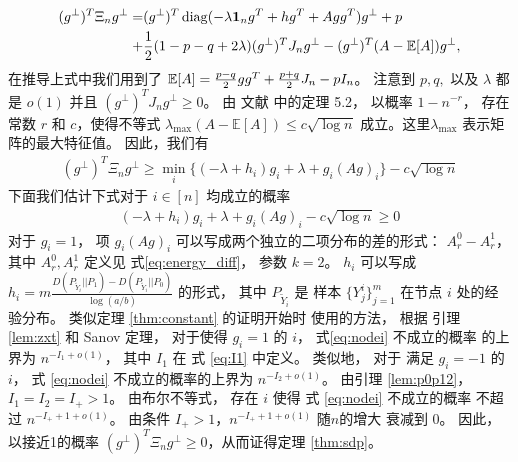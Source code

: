 \begin{align*}
    (g^{\perp})^T \Xi_n g^{\perp} 
    =& (g^{\perp})^T \operatorname{diag}( -\lambda \mathbf{1}_ng^T+hg^T + Agg^T) g^{\perp} + p \\
    +& \frac{1}{2}(1-p-q+2\lambda)(g^{\perp})^TJ_n g^{\perp}
    -(g^{\perp})^T(A-\operatorname{\mathbb{E}}[A])g^{\perp},
\end{align*}
在推导上式中我们用到了 $\operatorname{\mathbb{E}}[A] = \frac{p-q}{2}gg^T + \frac{p+q}{2}J_n - pI_n$。
注意到 $p,q,$ 以及 $\lambda$ 都是 $o(1)$ 并且
$(g^{\perp})^TJ_n g^{\perp}\ge 0$。
由 文献 中的定理 5.2，
以概率 $1-n^{-r}$， 存在
常数 $r$ 和 $c$，使得不等式 $\lambda_{\max}(A-\mathbb{E}[A]) \leq c\sqrt{\log n}$
成立。这里$\lambda_{\max}$ 表示矩阵的最大特征值。
因此，我们有
\begin{align}\label{eq:lastterm}
    (g^{\perp})^T \Xi_n g^{\perp} \geq \min_i\{(-\lambda + h_i) g_i+\lambda + g_i (Ag)_i \} - c \sqrt{\log n}
\end{align}
下面我们估计下式对于 $i\in [n]$ 均成立的概率
\begin{align}\label{eq:nodei}
    (-\lambda + h_i) g_i+\lambda + g_i (Ag)_i  - c \sqrt{\log n}\ge 0
\end{align}
对于 $g_i=1$，
项 $g_i(Ag)_i$ 可以写成两个独立的二项分布的差的形式：
$A_r^0-A_r^1$，其中 $A_r^0, A_r^1$ 定义见 式\eqref{eq:energy_diff}， 参数 $k=2$。
$h_i$ 可以写成 $h_i=m \frac{D(P_{\widetilde{Y}_i} || P_1) - D(P_{\widetilde{Y}_i} || P_0) }{\log (a /b)}$
的形式，
其中 $P_{\widetilde{Y}_i}$ 是
样本 $\{Y^i_j\}^m_{j=1}$ 在节点 $i$ 处的经验分布。
类似定理 \ref{thm:constant} 的证明开始时
使用的方法，
根据 引理 \ref{lem:zxt}  和  Sanov 定理，
对于使得 $g_i=1$ 的 $i$， 
式\eqref{eq:nodei} 不成立的概率
的上界为
$n^{-I_1 + o(1)}$，
其中 $I_1$ 在 式 \eqref{eq:I1} 中定义。
类似地，
对于 满足 $g_i=-1$ 的  $i$，
式 \eqref{eq:nodei} 不成立的概率的上界为 
$n^{-I_2 + o(1)}$。
由引理 \ref{lem:p0p12}，$I_1=I_2=I_+>1$。
由布尔不等式， 存在 $i$ 使得 式 \eqref{eq:nodei} 不成立的概率 不超过 $n^{-I_+ + 1 + o(1)}$。
由条件 $I_+>1$，$n^{-I_+ + 1 + o(1)}$ 随$n$的增大 衰减到 $0$。
因此，以接近1的概率 $(g^{\perp})^T \Xi_n g^{\perp}\ge 0$，从而证得定理 \ref{thm:sdp}。 



